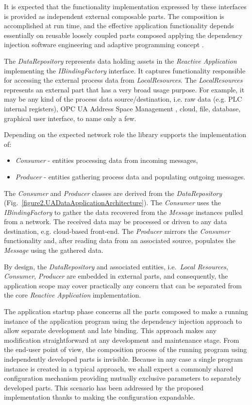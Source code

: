 \documentclass[runningheads]{llncs}
\begin{document}
It is expected that the functionality implementation expressed by these interfaces is provided as independent external composable parts. The composition is accomplished at run time, and the effective application functionality depends essentially on reusable loosely coupled parts composed applying the dependency injection software engineering and adaptive programming concept \cite{RefWorks:doc:5d9796cbe4b0f66c52dccf04}.

The \emph{DataRepository} represents data holding assets in the \emph{Reactive Application} implementing the \emph{IBindingFactory} interface. It captures functionality responsible for accessing the external process data from \emph{LocalResources}. The \emph{LocalResources} represents an external part that has a very broad usage purpose. For example, it may be any kind of the process data source/destination, i.e. raw data (e.g. PLC internal registers), OPC UA Address Space Management \cite{mpostol2020}, cloud, file, database, graphical user interface, to name only a few.

Depending on the expected network role the library supports the implementation of:

\begin{itemize}
      \item \emph{Consumer} - entities processing data from incoming messages,
      \item \emph{Producer} - entities gathering process data and populating outgoing messages.
\end{itemize}

The \emph{Consumer} and \emph{Producer} classes are derived from the \emph{DataRepository} (Fig.~\ref{figure2.UADataApplicationArchitecture}). The \emph{Consumer} uses the \emph{IBindingFactory} to gather the data recovered from the \emph{Message} instances pulled from a network. The received data may be processed or driven to any data destination, e.g. cloud-based front-end. The \emph{Producer} mirrors the \emph{Consumer} functionality and, after reading data from an associated source, populates the \emph{Message} using the gathered data.

By design, the \emph{DataRepository} and associated entities, i.e.~\emph{Local Resources}, \emph{Consumer}, \emph{Producer} are embedded in external parts, and consequently, the application scope may cover practically any concern that can be separated from the core \emph{Reactive Application} implementation.

The application startup phase concerns all the parts composed to make a running instance of the application program using the dependency injection approach to allow separate development and late binding. This approach makes any modification straightforward at any development and maintenance stage. From the end-user point of view, the composition process of the running program using independently developed parts is invisible. Because in any case a single program instance is created in a typical approach, we shall expect a commonly shared configuration mechanism providing mutually exclusive parameters to separately developed parts. This scenario has been addressed by the proposed implementation thanks to making the configuration expandable.
\end{document}
